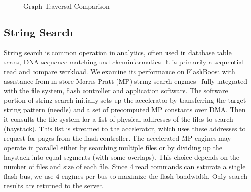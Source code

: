 
\begin{figure}[ht!]
	\centering
		\hfill
		\hfill
	\caption{Graph Traversal Comparison}
	\label{fig:graph_accel}
\end{figure}

\subsection{String Search}

String search is common operation in analytics, often used in
database table scans, DNA sequence matching and cheminformatics. It is 
primarily a sequential read and compare workload. We
examine its performance on FlashBoost with assistance from in-store Morris-Pratt (MP) 
string search engines~\cite{?} fully integrated with the file system, flash controller
and application software.  The software portion of string search initially sets
up the accelerator by transferring the target string pattern (needle) and a set
of precomputed MP constants over DMA. Then it consults the file system for a
list of physical addresses of the files to search (haystack).  This list is
streamed to the accelerator, which uses these addresses to request for pages
from the flash controller.  The accelerated MP engines may operate in parallel
either by searching multiple files or by dividing up the haystack into equal
segments (with some overlaps). This choice depends on the number of files and
size of each file. Since 4 read commands can saturate a single flash bus, we
use 4 engines per bus to maximize the flash bandwidth. Only
search results are returned to the server. 
